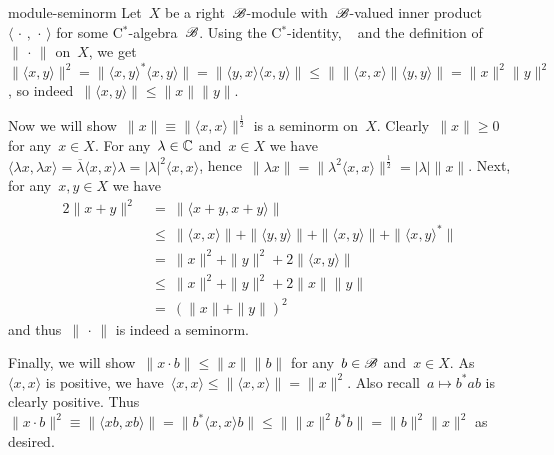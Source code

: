 \documentclass[b5page]{book}
\begin{document}
\begin{solution}{module-seminorm}%
Let~$X$ be a right~$\mathscr{B}$-module
with~$\mathscr{B}$-valued inner product~$\langle \,\cdot\,,\,\cdot\,\rangle$
    for some C$^*$-algebra~$\mathscr{B}$.
Using the C$^*$-identity, ~ and the definition
    of~$\|\,\cdot\,\|$ on~$X$, we
    get~$ \| \langle x, y\rangle\|^2
        = \| \langle x, y\rangle^* \langle x, y\rangle\|
        = \| \langle y,x \rangle\langle x,y\rangle \|
        \leq \bigl\| \|\langle x,x\rangle\| \langle y, y \rangle \bigr\|
        = \| x\|^2 \|y\|^2$,
        so indeed~$\|\langle x, y \rangle \| \leq \|x\|\|y\|$.

    Now we will show~$\|x\| \equiv \| \langle x,x\rangle\|^{\frac{1}{2}}$
    is a seminorm on~$X$.
    Clearly~$\|x\| \geq 0$ for any~$x \in X$.
For any~$\lambda \in \mathbb{C}$ and~$x \in X$
    we have~$\langle \lambda x, \lambda x \rangle
        = \overline\lambda \langle x, x \rangle \lambda
        = | \lambda |^2 \langle x,x\rangle$,
    hence~$
        \|\lambda x\|=
       \|\lambda^2 \langle x, x \rangle \|^{\frac{1}{2}} =
        |\lambda|  \|x\| $.
Next, for any~$x,y \in X$ we have
\begin{alignat*}{2}
    \| x + y \|^2 & \ = \  \| \langle x + y, x+y\rangle \| \\
    & \ \leq \ \| \langle x,x\rangle\| 
        + \| \langle y,y\rangle\|
        + \| \langle x, y \rangle \|
        + \| \langle x, y \rangle^* \| \\
    & \ = \ \|x\|^2 + \|y\|^2 + 2\|\langle x,y\rangle\| \\
    & \ \leq \ \|x\|^2 + \|y\|^2 + 2\|x\|\|y\| \\
    & \ =\ (\|x\| + \|y\|)^2
\end{alignat*}
and thus~$\|\,\cdot\,\|$ is indeed a seminorm.

Finally, we will show~$\|x \cdot b\| \leq \|x\|\|b\|$
    for any~$b\in \mathscr{B}$ and~$x \in X$.
As~$\langle x,x\rangle$ is positive,
    we have~$\langle x,x \rangle  \leq \|\langle x,x\rangle \|
            = \|x\|^2$.
Also recall~$a \mapsto b^* a b$ is clearly positive.
Thus~$\|x\cdot b\|^2 \equiv \|\langle xb, xb\rangle \|
        = \| b^* \langle x, x \rangle b\|
        \leq  \bigl\|
        \|x\|^2
        b^*b
        \bigr\|
        = \|b\|^2 \|x\|^2$ as desired.
\end{solution}

\backmatter
\fancyfoot[CE]{}
\fancyfoot[CO]{}

\begingroup
\renewcommand\chapter[2]{\backmattertitle{Bibliography}}
{}
\endgroup


\end{document}
